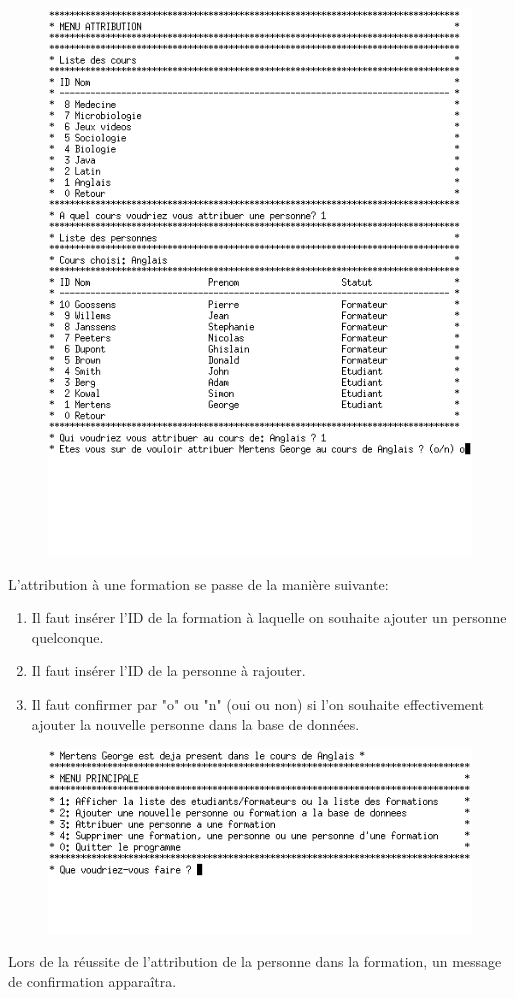 \documentclass[11pt]{article}
\begin{document}
\newpage
\begin{figure}[ht]
  \centering
  \includegraphics[trim=0 110 0 0, clip, scale=0.8]{images/14.png.png}
\end{figure}
L'attribution à une formation se passe de la manière suivante:
\begin{enumerate}
\item Il faut insérer l'ID de la formation à laquelle on souhaite ajouter un personne quelconque.
\item Il faut insérer l'ID de la personne à rajouter.
\item Il faut confirmer par "o" ou "n" (oui ou non) si l'on souhaite effectivement ajouter la nouvelle personne dans la base de données.
\end{enumerate}

\begin{figure}[ht]
  \centering
  \includegraphics[trim=0 60 0 0, clip, scale=0.8]{images/15.png.png}
\end{figure}
Lors de la réussite de l'attribution de la personne dans la formation, un message de confirmation apparaîtra.
\end{document}
